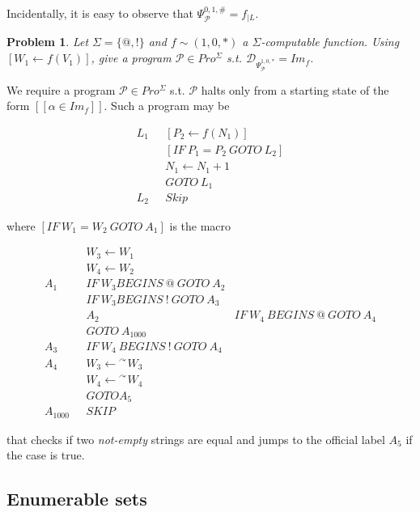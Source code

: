 \documentclass[a4paper, 12pt]{article}
\newtheorem{problem}{Problem}
\newtheorem{problem}{Problem}
\begin{document}
Incidentally, it is easy to observe that $\Psi_{\mathcal{P}}^{0, 1, \#} = f_{\mid L}$.

\begin{problem}
    Let $\Sigma = \{@, !\}$ and $f \sim (1, 0, *)$ a $\Sigma$-computable
    function. Using $\left[ W_1 \leftarrow f(V_1) \right] $, give a program
    $\mathcal{P} \in Pro^{\Sigma}$ s.t. $\mathcal{D}_{\Psi_{\mathcal{P}}^{1, 0,
    *}} = Im_{f}$.
\end{problem}

We require a program $\mathcal{P} \in Pro^{\Sigma}$ s.t. $\mathcal{P}$ halts
only from a starting state of the form $[\![ \alpha \in Im_f ]\!]$. Such a program
may be 

\begin{align*}
    L_1~ ~ ~&\left[P_2 \leftarrow f(N_1) \right]  \\ 
    &\left[ IF ~ P_1 = P_2 ~ GOTO ~ L_2 \right]  \\ 
    &N_1 \leftarrow N_1 + 1 \\ 
    &GOTO ~ L_1 \\ 
    L_2 ~ ~ ~ & Skip
\end{align*}

where $\left[ IF ~ W_1 = W_2 ~ GOTO ~ A_1 \right] $ is the macro

\begin{align*}
    &W_3 \leftarrow W_1  \\ 
    &W_4 \leftarrow W_2 \\ 
    A_1 ~ ~ ~ &IF ~ W_3 BEGINS ~ @ ~ GOTO ~ A_2 \\ 
    &IF ~ W_3 BEGINS ~ ! ~ GOTO ~ A_3 \\ 
    &
    A_2 ~ ~ ~ &IF~ W_4 ~ BEGINS ~ @ ~ GOTO ~ A_4 \\ 
              &GOTO ~ A_{1000}\\
    A_3 ~ ~ ~ &IF~ W_4 ~ BEGINS ~ ! ~ GOTO ~ A_4 \\ 
    A_4 ~ ~ ~ & W_3 \leftarrow {}^{\curvearrowright} W_3 \\ 
              &W_4 \leftarrow {}^{\curvearrowright} W_4 \\ 
              &GOTO A_5 \\ 
    A_{1000}~ ~ ~ & SKIP
\end{align*}

that checks if two \textit{not-empty} strings are equal and jumps to the
official label $A_5$ if the case is true.

\subsection{Enumerable sets}
\end{document}

